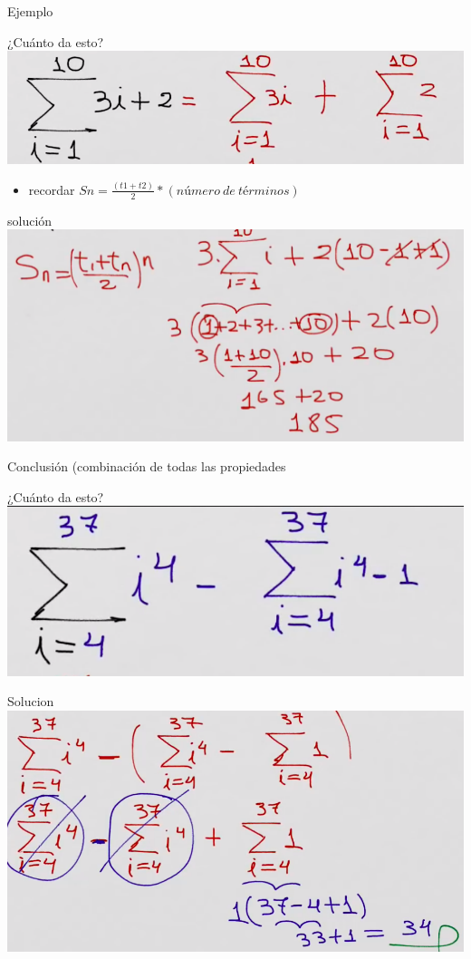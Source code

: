 \documentclass[presentation]{beamer}
\begin{document}
\begin{frame}[label=sec-9]{Ejemplo}
\begin{block}{¿Cuánto da esto?}
\includegraphics[width=.9\linewidth]{./ejercicio_desc.png}

\begin{itemize}
\item recordar \(Sn = \frac{(t1 + t2)}{2} * (número\ de\ términos)\)
\end{itemize}
\begin{block}{solución}
\includegraphics[width=.9\linewidth]{./ejercicio_desc2.png}
\end{block}
\end{block}

\begin{block}{Conclusión (combinación de todas las propiedades}
\begin{block}{¿Cuánto da esto?}
\includegraphics[width=.9\linewidth]{./ej_conclusion.png}
\end{block}

\begin{block}{Solucion}
\includegraphics[width=.9\linewidth]{./ej_conclusion2.png}
\end{block}
\end{block}
\end{frame}
\end{document}
